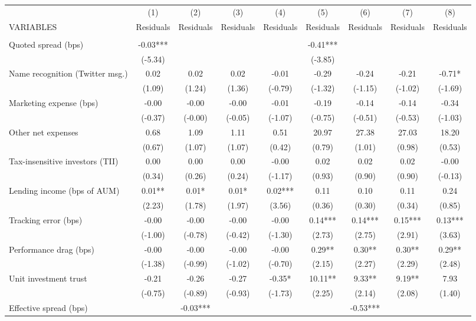 \documentclass[]{article}
\begin{document}
\begin{tabular}{lcccccccc} \hline
 & (1) & (2) & (3) & (4) & (5) & (6) & (7) & (8) \\
VARIABLES & Residuals & Residuals & Residuals & Residuals & Residuals & Residuals & Residuals & Residuals \\ \hline
 &  &  &  &  &  &  &  &  \\
Quoted spread (bps) & -0.03*** &  &  &  & -0.41*** &  &  &  \\
 & (-5.34) &  &  &  & (-3.85) &  &  &  \\
Name recognition (Twitter msg.) & 0.02 & 0.02 & 0.02 & -0.01 & -0.29 & -0.24 & -0.21 & -0.71* \\
 & (1.09) & (1.24) & (1.36) & (-0.79) & (-1.32) & (-1.15) & (-1.02) & (-1.69) \\
Marketing expense (bps) & -0.00 & -0.00 & -0.00 & -0.01 & -0.19 & -0.14 & -0.14 & -0.34 \\
 & (-0.37) & (-0.00) & (-0.05) & (-1.07) & (-0.75) & (-0.51) & (-0.53) & (-1.03) \\
Other net expenses & 0.68 & 1.09 & 1.11 & 0.51 & 20.97 & 27.38 & 27.03 & 18.20 \\
 & (0.67) & (1.07) & (1.07) & (0.42) & (0.79) & (1.01) & (0.98) & (0.53) \\
Tax-insensitive investors (TII) & 0.00 & 0.00 & 0.00 & -0.00 & 0.02 & 0.02 & 0.02 & -0.00 \\
 & (0.34) & (0.26) & (0.24) & (-1.17) & (0.93) & (0.90) & (0.90) & (-0.13) \\
Lending income (bps of AUM) & 0.01** & 0.01* & 0.01* & 0.02*** & 0.11 & 0.10 & 0.11 & 0.24 \\
 & (2.23) & (1.78) & (1.97) & (3.56) & (0.36) & (0.30) & (0.34) & (0.85) \\
Tracking error (bps) & -0.00 & -0.00 & -0.00 & -0.00 & 0.14*** & 0.14*** & 0.15*** & 0.13*** \\
 & (-1.00) & (-0.78) & (-0.42) & (-1.30) & (2.73) & (2.75) & (2.91) & (3.63) \\
Performance drag (bps) & -0.00 & -0.00 & -0.00 & -0.00 & 0.29** & 0.30** & 0.30** & 0.29** \\
 & (-1.38) & (-0.99) & (-1.02) & (-0.70) & (2.15) & (2.27) & (2.29) & (2.48) \\
Unit investment trust & -0.21 & -0.26 & -0.27 & -0.35* & 10.11** & 9.33** & 9.19** & 7.93 \\
 & (-0.75) & (-0.89) & (-0.93) & (-1.73) & (2.25) & (2.14) & (2.08) & (1.40) \\
Effective spread (bps) &  & -0.03*** &  &  &  & -0.53*** &  &  \\

\end{tabular}
\end{document}
